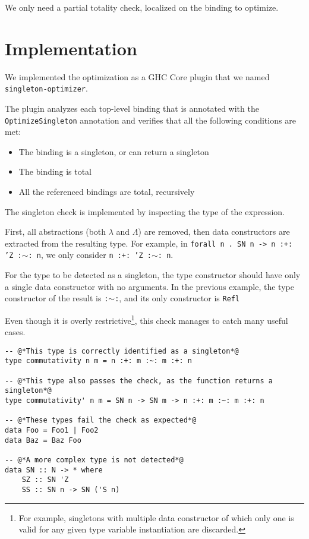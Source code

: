 We only need a partial totality check, localized on the binding to optimize.

\section{Implementation}
\label{sec:implementation}

We implemented the optimization as a GHC Core plugin\cite{ghc-docs-extending}\cite{ghc-wiki}\cite{ghc-library-docs} that we named \texttt{singleton-optimizer}.

The plugin analyzes each top-level binding that is annotated with the \texttt{OptimizeSingleton} annotation and verifies that all the following conditions are met:

\begin{itemize}
  \item{The binding is a singleton, or can return a singleton}
  \item{The binding is total}
  \item{All the referenced bindings are total, recursively}
\end{itemize}

The singleton check is implemented by inspecting the type of the expression.

First, all abstractions (both $\lambda$ and $\Lambda$) are removed, then data constructors are extracted from the resulting type.
For example, in \texttt{forall n . SN n -> n :+: 'Z :$\sim$: n}, we only consider \texttt{n :+: 'Z :$\sim$: n}.

For the type to be detected as a singleton, the type constructor should have only a single data constructor with no arguments.
In the previous example, the type constructor of the result is \texttt{:$\sim$:}, and its only constructor is \texttt{Refl}

Even though it is overly restrictive\footnote{For example, singletons with multiple data constructor of which only one is valid for any given type variable instantiation are discarded.}, this check manages to catch many useful cases.

\begin{lstlisting}[caption=Some examples of singleton detection]
-- @*This type is correctly identified as a singleton*@
type commutativity n m = n :+: m :~: m :+: n

-- @*This type also passes the check, as the function returns a singleton*@
type commutativity' n m = SN n -> SN m -> n :+: m :~: m :+: n

-- @*These types fail the check as expected*@
data Foo = Foo1 | Foo2
data Baz = Baz Foo

-- @*A more complex type is not detected*@
data SN :: N -> * where
    SZ :: SN 'Z
    SS :: SN n -> SN ('S n)
\end{lstlisting}


